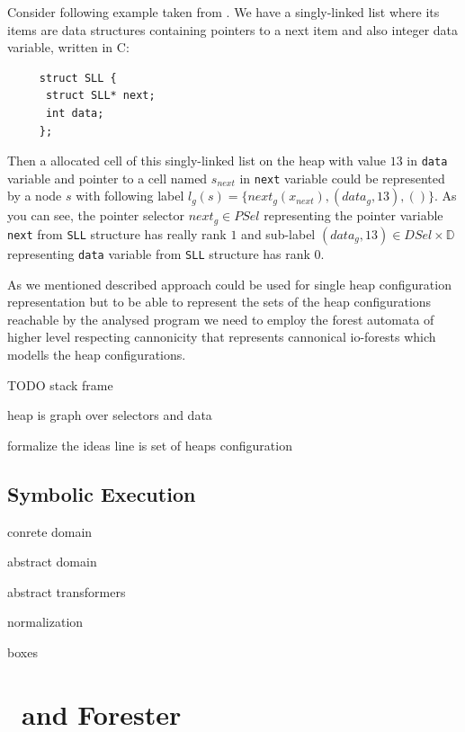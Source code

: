Consider following example taken from \cite{cav13tr}.
We have a singly-linked list where its items are data structures containing pointers to
a next item and also integer data variable, written in C:
\begin{center}
\begin{minipage}{0.3\textwidth}
    \begin{verbatim}
     struct SLL {
      struct SLL* next;
      int data;
     };
    \end{verbatim}
\end{minipage}
\end{center}
Then a allocated cell of this singly-linked list on the heap with value $13$ in \texttt{data} variable and pointer to a cell named $s_{next}$
in \texttt{next} variable could be represented
by a node $s$ with following label $l_g(s) = \{next_g(x_{next}),(data_g,13),()\}$.
As you can see, the pointer selector $next_g \in PSel$ representing the pointer variable \texttt{next} from \texttt{SLL} structure
has really rank $1$ and sub-label $(data_g,13) \in DSel\times \mathbb{D}$ representing \texttt{data} variable from \texttt{SLL} structure
has rank $0$.

As we mentioned described approach could be used for single heap configuration representation but to be able
to represent the sets of the heap configurations reachable by the analysed program we need
to employ the forest automata of higher level respecting cannonicity that represents cannonical io-forests
which modells the heap configurations.

TODO stack frame


heap is graph over selectors and data

formalize the ideas
line is set of heaps configuration

\section{Symbolic Execution}
\label{sec:se}

conrete domain

abstract domain

abstract transformers

normalization

boxes

\chapter{\vata\ and Forester}
\label{ch:tools}

